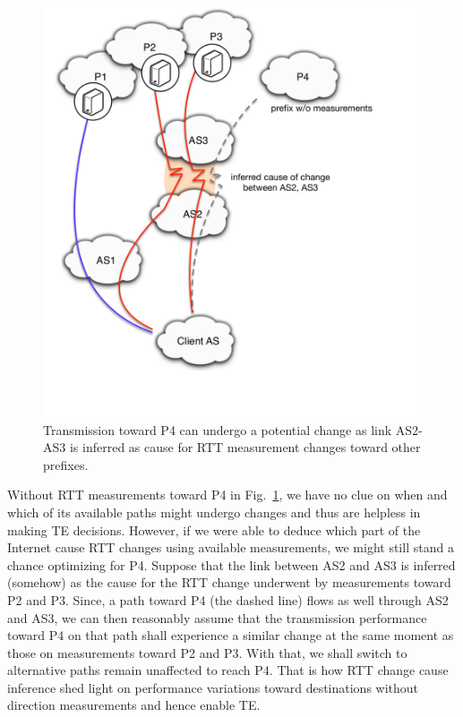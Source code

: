\begin{figure}[!htb]
\centering
\includegraphics[width=.7\textwidth]{gfx/chap5/cause_infer_te.pdf}
\caption{Transmission toward P4 can undergo a potential change as link AS2-AS3 is inferred as cause for RTT measurement changes toward other prefixes.}
\label{fig:chap5_cause_infer_te}
\end{figure}

Without RTT measurements toward P4 in Fig.~\ref{fig:chap5_cause_infer_te}, we have no clue on when and which of its available paths might undergo changes and thus are helpless in making TE decisions.
However, if we were able to deduce which part of the Internet cause RTT changes using available measurements, we might still stand a chance optimizing for P4.
Suppose that the link between AS2 and AS3 is inferred (somehow) as the cause for the RTT change underwent by measurements toward P2 and P3. 
Since, a path toward P4 (the dashed line) flows as well through AS2 and AS3, we can then reasonably assume that the transmission performance toward P4 on that path shall experience a similar change at the same moment as those on measurements toward P2 and P3.
With that, we shall switch to alternative paths remain unaffected to reach P4.
That is how RTT change cause inference shed light on performance variations toward destinations without direction measurements and hence enable TE.
 
